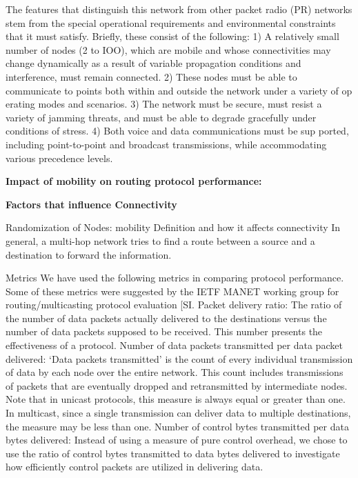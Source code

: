 \documentclass[letterpaper, 10 pt, conference]{ieeeconf}  %
\begin{document}
The features that distinguish this network from other
packet radio (PR) networks stem from the special operational
requirements and environmental constraints that it
must satisfy. Briefly, these consist of the following:
1) A relatively small number of nodes (2 to IOO), which
are mobile and whose connectivities may change dynamically
as a result of variable propagation conditions and interference,
must remain connected.
2) These nodes must be able to communicate to points
both within and outside the network under a variety of op
erating modes and scenarios.
3) The network must be secure, must resist a variety of
jamming threats, and must be able to degrade gracefully
under conditions of stress.
4) Both voice and data communications must be sup
ported, including point-to-point and broadcast transmissions,
while accommodating various precedence levels. 



\textbf{Impact of mobility on routing protocol performance:}


\textbf{Factors that influence Connectivity}


Randomization of Nodes: mobility Definition and how it affects connectivity In general, a multi-hop network tries to find a route between a source and a destination to forward the information. 











Metrics
We have used the following metrics in comparing protocol
performance. Some of these metrics were suggested by the IETF
MANET working group for routing/multicasting protocol evaluation
[SI.
Packet delivery ratio: The ratio of the number of data packets
actually delivered to the destinations versus the number of
data packets supposed to be received. This number presents the
effectiveness of a protocol.
Number of data packets transmitted per data packet delivered:
‘Data packets transmitted’ is the count of every individual
transmission of data by each node over the entire network.
This count includes transmissions of packets that are eventually
dropped and retransmitted by intermediate nodes. Note that in
unicast protocols, this measure is always equal or greater than
one. In multicast, since a single transmission can deliver data to
multiple destinations, the measure may be less than one.
Number of control bytes transmitted per data bytes delivered:
Instead of using a measure of pure control overhead,
we chose to use the ratio of control bytes transmitted to data
bytes delivered to investigate how efficiently control packets are
utilized in delivering data. 
\end{document}
